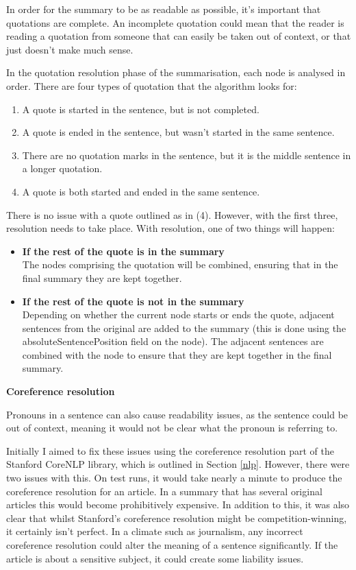 \documentclass[12pt]{article}
\begin{document}
In order for the summary to be as readable as possible, it's important that quotations are complete. An incomplete quotation could mean that the reader is reading a quotation from someone that can easily be taken out of context, or that just doesn't make much sense.

In the quotation resolution phase of the summarisation, each node is analysed in order. There are four types of quotation that the algorithm looks for:

\begin{enumerate}
	\item A quote is started in the sentence, but is not completed.
	\item A quote is ended in the sentence, but wasn't started in the same sentence.
	\item There are no quotation marks in the sentence, but it is the middle sentence in a longer quotation.
	\item A quote is both started and ended in the same sentence.
\end{enumerate}

There is no issue with a quote outlined as in (4). However, with the first three, resolution needs to take place. With resolution, one of two things will happen:

\begin{itemize}
	\item \textbf{If the rest of the quote is in the summary} \\ The nodes comprising the quotation will be combined, ensuring that in the final summary they are kept together. 
	\item \textbf{If the rest of the quote is not in the summary} \\ Depending on whether the current node starts or ends the quote, adjacent sentences from the original are added to the summary (this is done using the absoluteSentencePosition field on the node). The adjacent sentences are combined with the node to ensure that they are kept together in the final summary. \\
\end{itemize}

\textbf{Coreference resolution}

Pronouns in a sentence can also cause readability issues, as the sentence could be out of context, meaning it would not be clear what the pronoun is referring to.

Initially I aimed to fix these issues using the coreference resolution part of the Stanford CoreNLP \cite{corenlp} library, which is outlined in Section \ref{nlp}. However, there were two issues with this. On test runs, it would take nearly a minute to produce the coreference resolution for an article. In a summary that has several original articles this would become prohibitively expensive. In addition to this, it was also clear that whilst Stanford's coreference resolution might be competition-winning, it certainly isn't perfect. In a climate such as journalism, any incorrect coreference resolution could alter the meaning of a sentence significantly. If the article is about a sensitive subject, it could create some liability issues.
\end{document}

